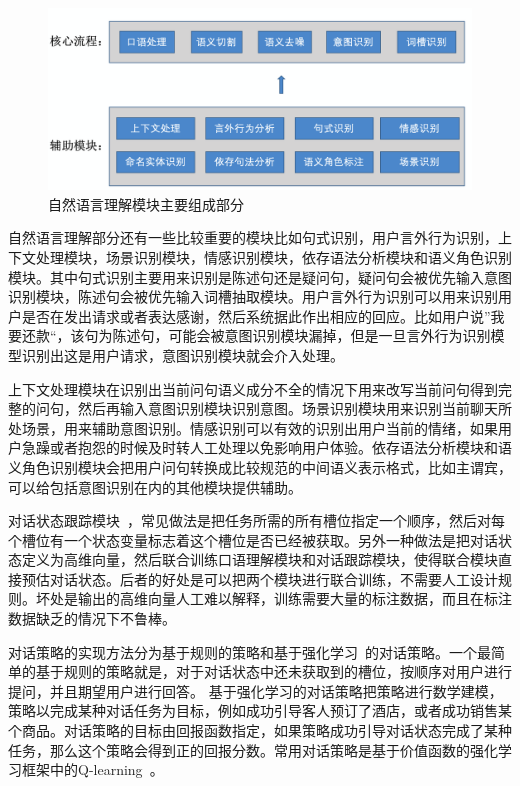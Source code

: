 \begin{figure}[H]
\centering
\includegraphics[scale=0.25]{chapters/nlu_process.png}
\caption{自然语言理解模块主要组成部分}
\label{fig:parserexample}
\end{figure}

自然语言理解部分还有一些比较重要的模块比如句式识别，用户言外行为识别，上下文处理模块，场景识别模块，情感识别模块，依存语法分析模块和语义角色识别模块。其中句式识别主要用来识别是陈述句还是疑问句，疑问句会被优先输入意图识别模块，陈述句会被优先输入词槽抽取模块。用户言外行为识别可以用来识别用户是否在发出请求或者表达感谢，然后系统据此作出相应的回应。比如用户说”我要还款“，该句为陈述句，可能会被意图识别模块漏掉，但是一旦言外行为识别模型识别出这是用户请求，意图识别模块就会介入处理。

上下文处理模块在识别出当前问句语义成分不全的情况下用来改写当前问句得到完整的问句，然后再输入意图识别模块识别意图。场景识别模块用来识别当前聊天所处场景，用来辅助意图识别。情感识别可以有效的识别出用户当前的情绪，如果用户急躁或者抱怨的时候及时转人工处理以免影响用户体验。依存语法分析模块和语义角色识别模块会把用户问句转换成比较规范的中间语义表示格式，比如主谓宾，可以给包括意图识别在内的其他模块提供辅助。

对话状态跟踪模块~\cite{young2007hidden,henderson2014robust,henderson2014word}，常见做法是把任务所需的所有槽位指定一个顺序，然后对每个槽位有一个状态变量标志着这个槽位是否已经被获取。另外一种做法是把对话状态定义为高维向量，然后联合训练口语理解模块和对话跟踪模块，使得联合模块直接预估对话状态。后者的好处是可以把两个模块进行联合训练，不需要人工设计规则。坏处是输出的高维向量人工难以解释，训练需要大量的标注数据，而且在标注数据缺乏的情况下不鲁棒。 

对话策略的实现方法分为基于规则的策略和基于强化学习~\cite{sutton1998reinforcement}的对话策略。一个最简单的基于规则的策略就是，对于对话状态中还未获取到的槽位，按顺序对用户进行提问，并且期望用户进行回答。
基于强化学习的对话策略把策略进行数学建模，策略以完成某种对话任务为目标，例如成功引导客人预订了酒店，或者成功销售某个商品。对话策略的目标由回报函数指定，如果策略成功引导对话状态完成了某种任务，那么这个策略会得到正的回报分数。常用对话策略是基于价值函数的强化学习框架中的Q-learning~\cite{watkins1989learning}。

